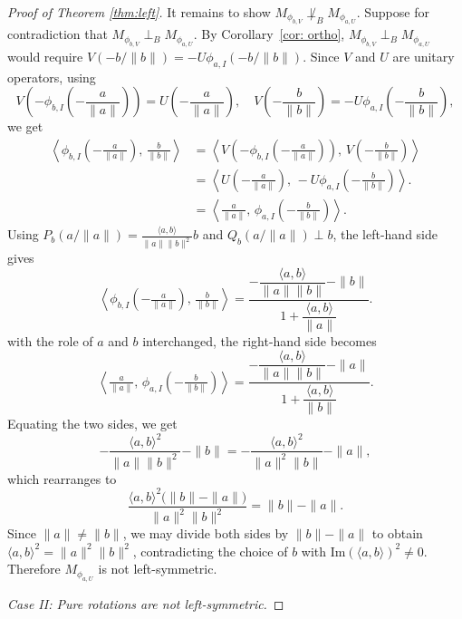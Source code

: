 \documentclass[12pt]{amsart}
\theoremstyle{definition}
\begin{document}
\begin{proof}[Proof of Theorem \ref{thm:left}]
\noindent It remains to show $M_{\phi_{b,V}} \not\perp_B M_{\phi_{a,U}}$. Suppose for contradiction that $M_{\phi_{b,V}} \perp_B M_{\phi_{a,U}}$. By Corollary~\ref{cor: ortho}, $M_{\phi_{b,V}} \perp_B M_{\phi_{a,U}}$ would 
require $V\!\left(-b/\|b\|\right) = 
-U\phi_{a,I}\!\left(-b/\|b\|\right)$. 
Since $V$ and $U$ are unitary operators, using 
\[
V\!\left(-\phi_{b,I}\!\left(-\frac{a}{\|a\|}\right)\right) 
= U\!\left(-\frac{a}{\|a\|}\right), \quad 
V\!\left(-\frac{b}{\|b\|}\right) 
= -U\phi_{a,I}\!\left(-\frac{b}{\|b\|}\right),
\]
we get
\begin{align*}
\left\langle 
\phi_{b,I}\!\left(-\tfrac{a}{\|a\|}\right),\, 
\tfrac{b}{\|b\|}
\right\rangle 
&= \left\langle 
V\!\left(-\phi_{b,I}\!\left(-\tfrac{a}{\|a\|}\right)\right),\, 
V\!\left(-\tfrac{b}{\|b\|}\right)
\right\rangle \\
&= \left\langle 
U(-\tfrac{a}{\|a\|}),\, 
-U\phi_{a,I}\!\left(-\tfrac{b}{\|b\|}\right)
\right\rangle.\\
&= \left\langle 
\tfrac{a}{\|a\|},\, 
\phi_{a,I}\!\left(-\tfrac{b}{\|b\|}\right)
\right\rangle.
\end{align*}
Using 
$P_b(a/\|a\|) = \frac{\langle a,b\rangle}{\|a\|\|b\|^2}b$ 
and $Q_b(a/\|a\|) \perp b$, the left-hand side gives
\[
\left\langle 
\phi_{b,I}\!\left(-\tfrac{a}{\|a\|}\right),\, 
\tfrac{b}{\|b\|}
\right\rangle 
= \frac{-\dfrac{\langle a,b\rangle}{\|a\|\|b\|} - \|b\|}
{1 + \dfrac{\langle a,b\rangle}{\|a\|}}.
\]
with the role of $a$ and $b$ interchanged, the right-hand side becomes
\[
\left\langle 
\tfrac{a}{\|a\|},\, 
\phi_{a,I}\!\left(-\tfrac{b}{\|b\|}\right)
\right\rangle 
= \frac{-\dfrac{\langle a,b\rangle}{\|a\|\|b\|} - \|a\|}
{1 + \dfrac{\langle a,b\rangle}{\|b\|}}.
\]
Equating the two sides, we get 
\[
-\frac{\langle a,b\rangle^2}{\|a\|\|b\|^2} - \|b\| 
= -\frac{\langle a,b\rangle^2}{\|a\|^2\|b\|} - \|a\|,
\]
which rearranges to
\[
\frac{\langle a,b\rangle^2\bigl(\|b\| - \|a\|\bigr)}
{\|a\|^2\|b\|^2} = \|b\| - \|a\|.
\]
Since $\|a\| \neq \|b\|$, we may divide both sides by 
$\|b\| - \|a\|$ to obtain 
$\langle a,b\rangle^2 = \|a\|^2\|b\|^2$, contradicting the choice of $b$ with 
$\mathrm{Im}(\langle a,b\rangle)^2 \neq 0$. Therefore $M_{\phi_{a,U}}$ is not left-symmetric.


\medskip


\noindent \textit{Case II: Pure rotations are not left-symmetric.}


\medskip



\end{proof}
\end{document}
